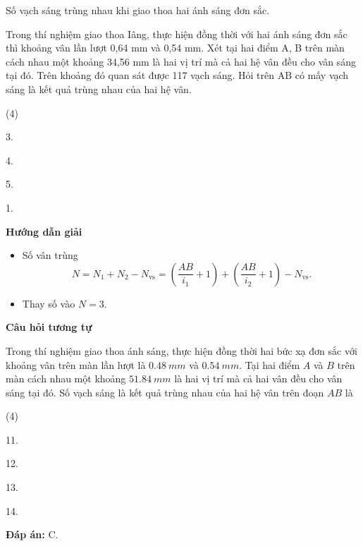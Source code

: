 \begin{dang}{Số vạch sáng trùng nhau khi giao thoa hai ánh sáng đơn sắc.}
	{
		Trong thí nghiệm giao thoa Iâng, thực hiện đồng thời với hai ánh sáng đơn sắc thì khoảng vân lần lượt 0,64 mm và 0,54 mm. Xét tại hai điểm A, B trên màn cách nhau một khoảng 34,56 mm là hai vị trí mà cả hai hệ vân đều cho vân sáng tại đó. Trên khoảng đó quan sát được 117 vạch sáng. Hỏi trên AB có mấy vạch sáng là kết quả trùng nhau của hai hệ vân.
		\begin{mcq}(4)
			\item  3.			
			\item  4.				
			\item  5.			
			\item  1.
		\end{mcq}
	}
	{
		\begin{center}
			\textbf{Hướng dẫn giải}
		\end{center}
		\begin{itemize}
			\item Số vân trùng 
			\begin{equation*} 
				N = N_1+N_2-N_{\text{vs}}=\left(\dfrac{AB}{i_1}+1\right) +\left(\dfrac{AB}{i_2}+1\right) - N_{\text{vs}}.
			\end{equation*}
			\item Thay số vào $N=3.$
		\end{itemize}
		
		\begin{center}
			\textbf{Câu hỏi tương tự}
		\end{center}
		
		Trong thí nghiệm giao thoa ánh sáng, thực hiện đồng thời hai bức xạ đơn sắc với khoảng vân trên màn lần lượt là $ \SI{0,48}{mm} $ và $ \SI{0,54}{mm} $. Tại hai điểm $ A $ và $ B $ trên màn cách nhau một khoảng $ \SI{51,84}{mm} $ là hai vị trí mà cả hai vân đều cho vân sáng tại đó. Số vạch sáng là kết quả trùng nhau của hai hệ vân trên đoạn $ AB $ là
		\begin{mcq}(4)
			\item 11.			
			\item 12.				
			\item 13.			
			\item 14.
		\end{mcq}
		
		\textbf{Đáp án:} C.
	}
	

\end{dang}
